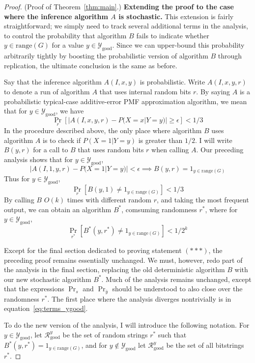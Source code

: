 \documentclass{article}
\def \Ygood{\mathcal{Y}_\text{good}}
\def \Rgood{\mathcal{R}_\text{good}}
\def \by{{\bar{y}}}
\theoremstyle{definition}
\theoremstyle{remark}
\begin{document}
\begin{proof}{(Proof of Theorem~\ref{thm:main}.)}
\medskip
\noindent
\textbf{Extending the proof to the case where the inference algorithm $A$ is stochastic.}
This extension is fairly straightforward; we simply need to track several additional terms in the analysis, to control the probability that algorithm $B$ fails to indicate whether $y \in \text{range}(G)$ for a value $y \in \Ygood$.
Since we can upper-bound this probability arbitrarily tightly by boosting the probabilistic version of algorithm $B$ through replication, the ultimate conclusion is the same as before.

Say that the inference algorithm $A(I, x, y)$ is probabilistic.
Write $A(I, x, y, r)$ to denote a run of algorithm $A$ that uses internal random bits $r$.
By saying $A$ is a probabilistic typical-case additive-error PMF approximation algorithm, we mean that for $y \in \Ygood$, we have
$$
\Pr_r [|A(I, x, y, r) - P(X = x | Y = y)| \geq \epsilon] < 1/3
$$
In the procedure described above, the only place where algorithm $B$ uses algorithm $A$ is to check if $P(X = 1 | Y = y)$ is greater than $1/2$.
I will write $B(y, r)$ for a call to $B$ that uses random bits $r$ when calling $A$.
Our preceding analysis shows that for $y \in \Ygood$,
$$
|A(I, 1, y, r) - P(X = 1 | Y = y)| < \epsilon \implies  B(y, r) = 1_{y \in \text{range}(G)}
$$
Thus for $y \in \Ygood$,
$$
\Pr_r [B(y, 1) \neq 1_{y \in \text{range}(G)}] < 1/3
$$
By calling $B$ $O(k)$ times with different random $r$, and taking the most frequent output, we can obtain an algorithm $B^*$, comsuming randomness $r^*$, where for $y \in \Ygood$,
$$
\Pr_{r^*} [B^*(y, r^*) \neq 1_{y \in \text{range}(G)}] < 1/2^k
$$

Except for the final section dedicated to proving statement $(***)$, the preceding proof remains essentially unchanged.
We must, however, redo part of the analysis in the final section, replacing the old deterministic algorithm $B$ with our new stochastic algorithm $B^*$.
Much of the analysis remains unchanged, except that
the expressions $\Pr_s$ and $\Pr_\by$ should be understood to also close over the randomness $r^*$.
The first place where the analysis diverges nontrivially is in equation~\ref{eq:terms_ygood}.

To do the new version of the analysis, I will introduce the following notation. For $y \in \Ygood$, let $\Rgood^y$ be the set of random strings $r^*$ such that $B^*(y, r^*) = 1_{y \in \text{range}(G)}$,
and for $y \notin \Ygood$ let $\Rgood^y$ be the set of all bitstrings $r^*$.


\end{proof}
\end{document}
